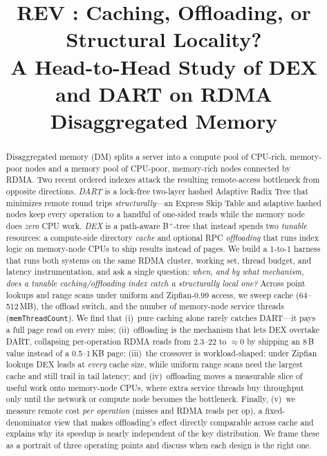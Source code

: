 \documentclass[sigconf,nonacm]{acmart}
\begin{document}
\title{REV : Caching, Offloading, or Structural Locality?\\
A Head-to-Head Study of DEX and DART on RDMA Disaggregated Memory}

\author{}
\affiliation{%
  \institution{}
  \country{}
}

\begin{abstract}
Disaggregated memory (DM) splits a server into a compute pool of CPU-rich,
memory-poor nodes and a memory pool of CPU-poor, memory-rich nodes connected by
RDMA. Two recent ordered indexes attack the resulting remote-access bottleneck
from opposite directions. \emph{DART} is a lock-free two-layer hashed Adaptive
Radix Tree that minimizes remote round trips \emph{structurally}---an Express
Skip Table and adaptive hashed nodes keep every operation to a handful of
one-sided reads while the memory node does \emph{zero} CPU work. \emph{DEX} is a
path-aware B$^+$-tree that instead spends two \emph{tunable} resources: a
compute-side directory \emph{cache} and optional RPC \emph{offloading} that runs
index logic on memory-node CPUs to ship results instead of pages. We build a
1-to-1 harness that runs both systems on the same RDMA cluster, working set,
thread budget, and latency instrumentation, and ask a single question:
\emph{when, and by what mechanism, does a tunable caching/offloading index catch
a structurally local one?} Across point lookups and range scans under uniform
and Zipfian-0.99 access, we sweep cache (64--512\,MB), the offload switch, and
the number of memory-node service threads (\texttt{memThreadCount}). We find
that (i)~pure caching alone rarely catches DART---it pays a full page read on
every miss; (ii)~offloading is the mechanism that lets DEX overtake DART,
collapsing per-operation RDMA reads from $2.3$--$22$ to $\approx0$ by shipping an
8\,B value instead of a 0.5--1\,KB page; (iii)~the crossover is workload-shaped:
under Zipfian lookups DEX leads at \emph{every} cache size, while uniform range
scans need the largest cache and still trail in tail latency; and (iv)~offloading
moves a measurable slice of useful work onto memory-node CPUs, where extra
service threads buy throughput only until the network or compute node becomes the
bottleneck. Finally, (v)~we measure remote cost \emph{per operation} (misses and
RDMA reads per op), a fixed-denominator view that makes offloading's effect
directly comparable across cache and explains why its speedup is nearly
independent of the key distribution. We frame these as a portrait of three
operating points and discuss when each design is the right one.
\end{abstract}
\end{document}
